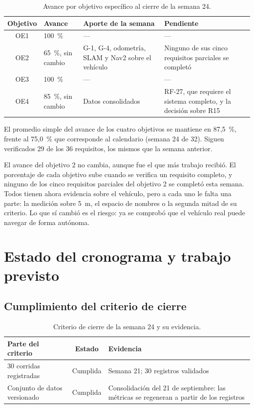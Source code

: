 \documentclass[12pt,letterpaper]{article}
\begin{document}
\begin{table}[H]
    \centering
    \small
    \caption{Avance por objetivo específico al cierre de la semana 24.}
    \label{tab:objetivos}
    \begin{tabular}{@{}cp{2.6cm}p{4.6cm}p{4.6cm}@{}}
        \toprule
        \textbf{Objetivo} & \textbf{Avance} & \textbf{Aporte de la semana} & \textbf{Pendiente} \\ \midrule
        OE1 & 100~\% & --- & --- \\ \addlinespace
        OE2 & 65~\%, sin cambio & G-1, G-4, odometría, SLAM y Nav2 sobre el vehículo & Ninguno de sus cinco requisitos parciales se completó \\ \addlinespace
        OE3 & 100~\% & --- & --- \\ \addlinespace
        OE4 & 85~\%, sin cambio & Datos consolidados & RF-27, que requiere el sistema completo, y la decisión sobre R15 \\ \bottomrule
    \end{tabular}
\end{table}

El promedio simple del avance de los cuatro objetivos se mantiene en 87,5~\%, frente al 75,0~\% que corresponde al calendario (semana 24 de 32). Siguen verificados 29 de los 36 requisitos, los mismos que la semana anterior.

El avance del objetivo 2 no cambia, aunque fue el que más trabajo recibió. El porcentaje de cada objetivo sube cuando se verifica un requisito completo, y ninguno de los cinco requisitos parciales del objetivo 2 se completó esta semana. Todos tienen ahora evidencia sobre el vehículo, pero a cada uno le falta una parte: la medición sobre 5~m, el espacio de nombres o la segunda mitad de su criterio. Lo que sí cambió es el riesgo: ya se comprobó que el vehículo real puede navegar de forma autónoma.

\section{Estado del cronograma y trabajo previsto}
\label{sec:cronograma}

\subsection{Cumplimiento del criterio de cierre}

\begin{table}[H]
    \centering
    \small
    \caption{Criterio de cierre de la semana 24 y su evidencia.}
    \label{tab:cierre}
    \begin{tabular}{@{}p{5.0cm}cp{6.8cm}@{}}
        \toprule
        \textbf{Parte del criterio} & \textbf{Estado} & \textbf{Evidencia} \\ \midrule
        30 corridas registradas & Cumplida & Semana 21; 30 registros validados \\ \addlinespace
        Conjunto de datos versionado & Cumplida & Consolidación del 21 de septiembre: las métricas se regeneran a partir de los registros \\ \bottomrule
    \end{tabular}
\end{table}
\end{document}
